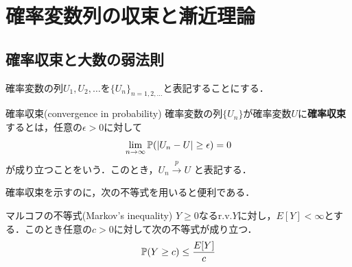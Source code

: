 \documentclass[main.tex]{subfiles}
\begin{document}
\section{確率変数列の収束と漸近理論}

\subsection{確率収束と大数の弱法則}
確率変数の列$U_1,U_2,\dots$を$\{U_n\}_{n=1,2,\dots}$と表記することにする．

\begin{mydefinition}{確率収束(convergence in probability)}
\label{def:convergence_in_probability} %
  確率変数の列$\{U_n\}$が確率変数$U$に\textbf{確率収束}するとは，任意の$\epsilon >0$に対して
  \begin{equation}
    \lim_{n \to \infty} \mathbb{P}(|U_n - U| \geq \epsilon) = 0
  \end{equation}
  が成り立つことをいう．このとき，$U_n \xrightarrow{p} U$ と表記する．
\end{mydefinition}

確率収束を示すのに，次の不等式を用いると便利である．
\begin{mylemma}{マルコフの不等式(Markov's inequality)}
\label{lem:markov_inequality} %
  $Y \geq 0$なるr.v.\quad $Y$に対し，$E[Y] < \infty$とする．このとき任意の$c > 0$に対して次の不等式が成り立つ．
  \begin{equation}
    \mathbb{P}(Y \geq c) \leq \frac{E[Y]}{c}
    \label{eq:markov_inequality}
  \end{equation}
\end{mylemma}
\end{document}
